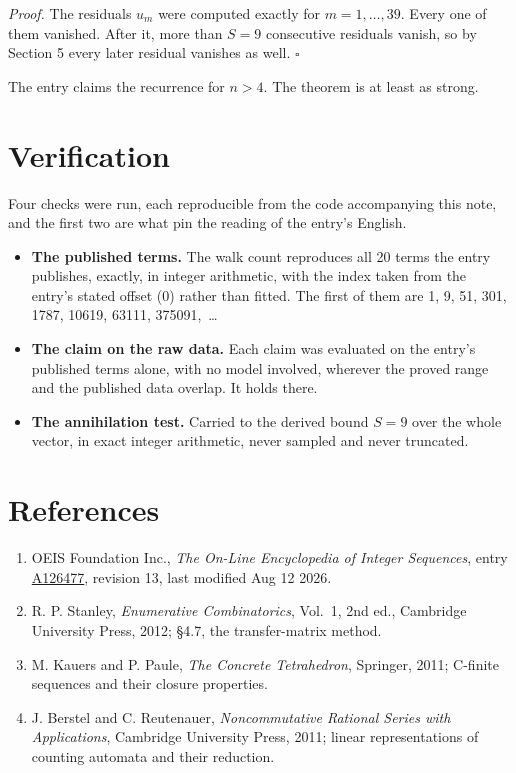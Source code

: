 \documentclass[11pt]{article}
\theoremstyle{definition}
\begin{document}
{\itshape Proof.} The residuals $u_m$ were computed exactly for $m = 1,\dots,39$. Every one of them vanished. After it, more than $S = 9$ consecutive residuals vanish, so by Section 5 every later residual vanishes as well. $\square$

The entry claims the recurrence for $n > 4$. The theorem is at least as strong.

\section{Verification}

Four checks were run, each reproducible from the code accompanying this note, and the first two are what pin the reading of the entry's English.

\begin{itemize}

\item {\bfseries The published terms.} The walk count reproduces all 20 terms the entry publishes, exactly, in integer arithmetic, with the index taken from the entry's stated offset (0) rather than fitted. The first of them are 1, 9, 51, 301, 1787, 10619, 63111, 375091,~\dots

\item {\bfseries The claim on the raw data.} Each claim was evaluated on the entry's published terms alone, with no model involved, wherever the proved range and the published data overlap. It holds there.

\item {\bfseries The annihilation test.} Carried to the derived bound $S = 9$ over the whole vector, in exact integer arithmetic, never sampled and never truncated.

\end{itemize}

\section{References}

\begin{enumerate}

\item OEIS Foundation Inc., \emph{The On-Line Encyclopedia of Integer Sequences}, entry \href{https://oeis.org/A126477}{A126477}, revision 13, last modified Aug 12 2026.

\item R. P. Stanley, \emph{Enumerative Combinatorics}, Vol.~1, 2nd ed., Cambridge University Press, 2012; \S4.7, the transfer-matrix method.

\item M. Kauers and P. Paule, \emph{The Concrete Tetrahedron}, Springer, 2011; C-finite sequences and their closure properties.

\item J. Berstel and C. Reutenauer, \emph{Noncommutative Rational Series with Applications}, Cambridge University Press, 2011; linear representations of counting automata and their reduction.

\end{enumerate}
\end{document}
